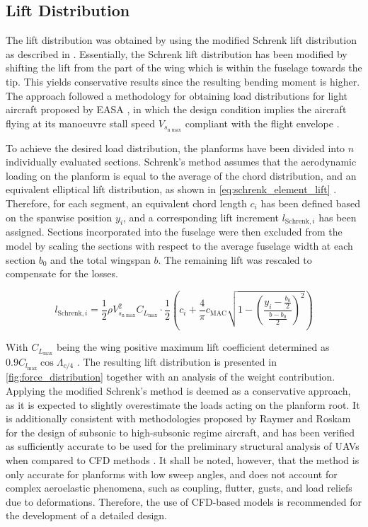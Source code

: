 \subsection{Lift Distribution}
\label{sub:lift}
The lift distribution was obtained by using the modified Schrenk lift distribution as described in \cite{EASALSALoadCalculation}. Essentially, the Schrenk lift distribution \cite{Schrenk1940} has been  modified by shifting the lift from the part of the wing which is within the fuselage towards the tip. This yields conservative results since the resulting bending moment is higher. The approach followed a methodology for obtaining load distributions for light aircraft proposed by EASA \cite{EASALSALoadCalculation}, in which the design condition implies the aircraft flying at its manoeuvre stall speed $V_{s_\text{n max}}$ compliant with the flight envelope .

To achieve the desired load distribution, the planforms have been divided into $n$ individually evaluated sections. Schrenk's method assumes that the aerodynamic loading on the planform is equal to the average of the chord distribution, and an equivalent elliptical lift distribution, as shown in \autoref{eq:schrenk_element_lift} \cite[p. 20]{EASALSALoadCalculation}. Therefore, for each segment, an equivalent chord length $c_i$ has been defined based on the spanwise position $y_i$, and a corresponding lift increment $l_{\text{Schrenk},i}$ has been assigned. Sections incorporated into the fuselage were then excluded from the model by scaling the sections with respect to the average fuselage width at each section $b_0$ and the total wingspan $b$. The remaining lift was rescaled to compensate for the losses. 

\begin{equation}
    \label{eq:schrenk_element_lift}
l_{\text{Schrenk},i} = \frac{1}{2}\rho V_{s_\text{n max}}^2C_{L_\text{max}}\cdot\frac{1}{2}
\left(c_i+\frac{4}{\pi}c_{\mathrm{MAC}}\sqrt{1-\left(\frac{y_i-\frac{b_0}{2}}
{\frac{b-b_0}{2}}\right)^2}\right)
\end{equation}

With $C_{L_{\text{max}}}$ being the wing positive maximum lift coefficient determined as $0.9C_{l_{\text{max}}}\cos\Lambda_{c/4}$ \cite[p. 153]{torenbeek2013synthesis}. The resulting lift distribution is presented in \autoref{fig:force_distribution} together with an analysis of the weight contribution. Applying the modified Schrenk's method is deemed as a conservative approach, as it is expected to slightly overestimate the loads acting on the planform root. It is additionally consistent with methodologies proposed by Raymer \cite{raymer1992aircraft} and Roskam \cite{roskamVI} for the design of subsonic to high-subsonic regime aircraft, and has been verified as sufficiently accurate to be used for the preliminary structural analysis of UAVs when compared to CFD methods \cite{Kamal2019}. It shall be noted, however, that the method is only accurate for planforms with low sweep angles, and does not account for complex aeroelastic phenomena, such as coupling, flutter, gusts, and load reliefs due to deformations. Therefore, the use of CFD-based models is recommended for the development of a detailed design.

